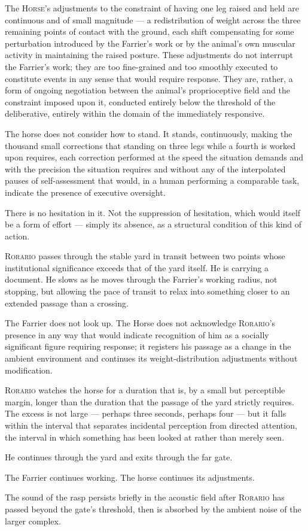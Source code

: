 \documentclass[12pt, oneside]{article}
\newenvironment{action}{%
  \vspace{0.6em}%
  \noindent\ignorespaces%
}{%
  \par\vspace{0.6em}%
}
\begin{document}
\begin{action}
The \textsc{Horse}'s adjustments to the constraint of having one leg raised and held are continuous and of small magnitude --- a redistribution of weight across the three remaining points of contact with the ground, each shift compensating for some perturbation introduced by the Farrier's work or by the animal's own muscular activity in maintaining the raised posture. These adjustments do not interrupt the Farrier's work; they are too fine-grained and too smoothly executed to constitute events in any sense that would require response. They are, rather, a form of ongoing negotiation between the animal's proprioceptive field and the constraint imposed upon it, conducted entirely below the threshold of the deliberative, entirely within the domain of the immediately responsive.

The horse does not consider how to stand. It stands, continuously, making the thousand small corrections that standing on three legs while a fourth is worked upon requires, each correction performed at the speed the situation demands and with the precision the situation requires and without any of the interpolated pauses of self-assessment that would, in a human performing a comparable task, indicate the presence of executive oversight.

There is no hesitation in it. Not the suppression of hesitation, which would itself be a form of effort --- simply its absence, as a structural condition of this kind of action.
\end{action}

\begin{action}
\textsc{Rorario} passes through the stable yard in transit between two points whose institutional significance exceeds that of the yard itself. He is carrying a document. He slows as he moves through the Farrier's working radius, not stopping, but allowing the pace of transit to relax into something closer to an extended passage than a crossing.

The Farrier does not look up. The Horse does not acknowledge \textsc{Rorario}'s presence in any way that would indicate recognition of him as a socially significant figure requiring response; it registers his passage as a change in the ambient environment and continues its weight-distribution adjustments without modification.

\textsc{Rorario} watches the horse for a duration that is, by a small but perceptible margin, longer than the duration that the passage of the yard strictly requires. The excess is not large --- perhaps three seconds, perhaps four --- but it falls within the interval that separates incidental perception from directed attention, the interval in which something has been looked at rather than merely seen.

He continues through the yard and exits through the far gate.

The Farrier continues working. The horse continues its adjustments.

The sound of the rasp persists briefly in the acoustic field after \textsc{Rorario} has passed beyond the gate's threshold, then is absorbed by the ambient noise of the larger complex.
\end{action}
\end{document}
